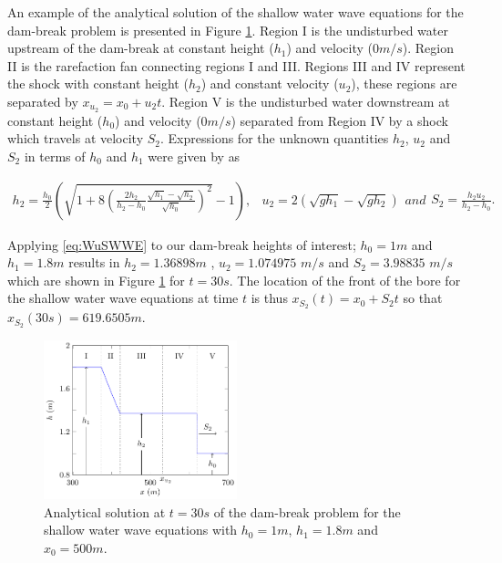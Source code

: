 \documentclass[times]{elsarticle}
\begin{document}
An example of the analytical solution of the shallow water wave equations for the dam-break problem is presented in Figure \ref{fig:SWWEanadiagram}. Region I is the undisturbed water upstream of the dam-break at constant height ($h_1$) and velocity ($0m/s$). Region II is the rarefaction fan connecting regions I and III. Regions III and IV represent the shock with constant height ($h_2$) and constant velocity ($u_2$), these regions are separated by $x_{u_2} = x_0 + u_2t$. Region V is the undisturbed water downstream at constant height ($h_0$) and velocity ($0m/s$) separated from Region IV by a shock which travels at velocity $S_2$. Expressions for the unknown quantities $h_2$, $u_2$ and $S_2$ in terms of $h_0$ and $h_1$ were given by \citet{Wu-etal-1999-1210} as
\begin{linenomath*}
\begin{subequations}
\begin{gather}
h_2 = \frac{h_0}{2} \left(\sqrt{1 + 8 \left(\frac{2h_2}{h_2 - h_0}\frac{\sqrt{h_1} - \sqrt{h_2}}{\sqrt{h_0}}\right)^2} - 1\right),
\end{gather}
	\begin{gather}
	u_2 = 2\left(\sqrt{gh_1} - \sqrt{gh_2}\right)
	\end{gather}
and
	\begin{gather}
	S_2 = \frac{h_2 u_2}{h_2 - h_0}.
	\end{gather}
\label{eq:WuSWWE}	
\end{subequations}
\end{linenomath*}
Applying \eqref{eq:WuSWWE} to our dam-break heights of interest; $h_0 =1m$ and $h_1 = 1.8m$ results in $h_2 = 1.36898m$ , $u_2 = 1.074975$ $m/s$ and $S_2 = 3.98835$ $m/s$ which are shown in Figure \ref{fig:SWWEanadiagram} for $t=30s$. The location of the front of the bore for the shallow water wave equations at time $t$ is thus $x_{S_2}(t) = x_0 + S_2 t$ so that $x_{S_2}(30s) = 619.6505m$.

\begin{figure}
	\centering
	\includegraphics[width=0.5\textwidth]{Figure-2.pdf}
	\caption{Analytical solution at $t=30s$ of the dam-break problem for the shallow water wave equations with $h_0 = 1m$, $h_1=1.8m$ and $x_0=500m$.}
	\label{fig:SWWEanadiagram}
\end{figure}
\end{document}

